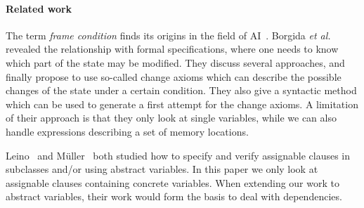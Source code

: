 \documentclass[a4paper]{llncs}
\newcommand{\jml}{\textsc{Jml}}
\newcommand{\escj}{\textsc{Esc/Java}}
\newcommand{\java}{\textsc{Java}}
\newcommand{\modtool}{\texttt{ChAstE}}
\begin{document}

\paragraph{\bf{Related work}}
The term \emph{frame condition} finds its origins in the field of
AI~\cite{McCarthyH69}. Borgida \emph{et al.} revealed the relationship
with formal specifications, where one needs to know which part of the
state may be modified. They discuss several approaches, and finally
propose to use so-called change axioms which can describe the possible
changes of the state under a certain condition. They also give a
syntactic method which can be used to generate a first attempt for the
change axioms. A limitation of their approach is that they only look
at single variables, while we can also handle expressions describing a
set of memory locations.

Leino~\cite{Leino98} and M\"uller~\cite{Mueller01} both studied
how to specify and verify assignable clauses in subclasses and/or
using abstract variables. In this paper we only look at assignable
clauses containing concrete variables. When extending our work to
abstract variables, their work would form the basis to deal with
dependencies. 
\end{document}
